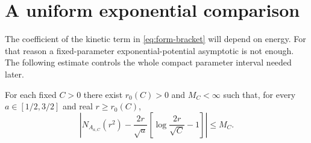 \section{A uniform exponential comparison}
\label{sec:comparator}

The coefficient of the kinetic term in
\eqref{eq:form-bracket} will depend on energy.
For that reason a fixed-parameter exponential-potential
asymptotic is not enough. The following estimate controls the
whole compact parameter interval needed later.

\begin{lemma}
\label{lem:comparator}
For each fixed $C>0$ there exist $r_0(C)>0$ and $M_C<\infty$
such that, for every $a\in[1/2,3/2]$ and real $r\ge r_0(C)$,
\begin{equation}
\left|N_{A_{a,C}}(r^2)
 -\frac{2r}{\sqrt a}
       \left[\log\frac{2r}{\sqrt C}-1\right]\right|
\le M_C.
\label{eq:uniform-count}
\end{equation}
\end{lemma}

